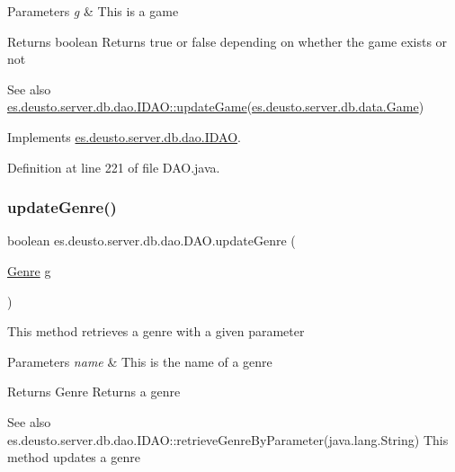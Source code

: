 \begin{DoxyParams}{Parameters}
{\em g} & This is a game \\
\hline
\end{DoxyParams}
\begin{DoxyReturn}{Returns}
boolean Returns true or false depending on whether the game exists or not 
\end{DoxyReturn}
\begin{DoxySeeAlso}{See also}
\hyperlink{interfacees_1_1deusto_1_1server_1_1db_1_1dao_1_1_i_d_a_o_a3a3ca0456879e35349a937aac661ff3f}{es.\+deusto.\+server.\+db.\+dao.\+I\+D\+A\+O\+::update\+Game}(\hyperlink{classes_1_1deusto_1_1server_1_1db_1_1data_1_1_game}{es.\+deusto.\+server.\+db.\+data.\+Game}) 
\end{DoxySeeAlso}


Implements \hyperlink{interfacees_1_1deusto_1_1server_1_1db_1_1dao_1_1_i_d_a_o_a3a3ca0456879e35349a937aac661ff3f}{es.\+deusto.\+server.\+db.\+dao.\+I\+D\+AO}.



Definition at line 221 of file D\+A\+O.\+java.

\mbox{\label{classes_1_1deusto_1_1server_1_1db_1_1dao_1_1_d_a_o_ae08384fb32fa6936c93f6292dbe02c7e}} 
\subsubsection{\texorpdfstring{update\+Genre()}{updateGenre()}}
{\footnotesize\ttfamily boolean es.\+deusto.\+server.\+db.\+dao.\+D\+A\+O.\+update\+Genre (\begin{DoxyParamCaption}\item[{\hyperlink{classes_1_1deusto_1_1server_1_1db_1_1data_1_1_genre}{Genre}}]{g }\end{DoxyParamCaption})}

This method retrieves a genre with a given parameter 
\begin{DoxyParams}{Parameters}
{\em name} & This is the name of a genre \\
\hline
\end{DoxyParams}
\begin{DoxyReturn}{Returns}
Genre Returns a genre 
\end{DoxyReturn}
\begin{DoxySeeAlso}{See also}
es.\+deusto.\+server.\+db.\+dao.\+I\+D\+A\+O\+::retrieve\+Genre\+By\+Parameter(java.\+lang.\+String) This method updates a genre 
\end{DoxySeeAlso}

